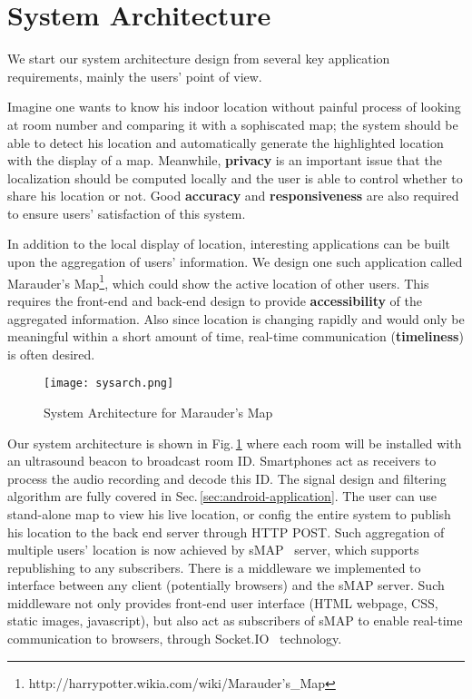 \section{System Architecture}
\label{sec:system-architecture}
We start our system architecture design from several key application requirements, mainly the users' point of view.

Imagine one wants to know his indoor location without painful process of looking at room number and comparing it with a sophiscated map; the system should be able to detect his location and automatically generate the highlighted location with the display of a map. Meanwhile, {\bf privacy} is an important issue that the localization should be computed locally and the user is able to control whether to share his location or not. Good {\bf accuracy} and {\bf responsiveness} are also required to ensure users' satisfaction of this system.  

In addition to the local display of location, interesting applications can be built upon the aggregation of users' information. We design one such application called Marauder's Map\footnote{http://harrypotter.wikia.com/wiki/Marauder's\_Map}, which could show the active location of other users. This requires the front-end and back-end design to provide {\bf accessibility} of the aggregated information. Also since location is changing rapidly and would only be meaningful within a short amount of time, real-time communication ({\bf timeliness}) is often desired.

\begin{figure}
  \centering
  \texttt{[image: sysarch.png]}
  \caption{System Architecture for Marauder's Map}
  \label{fig:sysarch}
\end{figure}

Our system architecture is shown in Fig.\,\ref{fig:sysarch} where each room will be installed with an ultrasound beacon to broadcast room ID. Smartphones act as receivers to process the audio recording and decode this ID. The signal design and filtering algorithm are fully covered in Sec.\,\ref{sec:android-application}. The user can use stand-alone map to view his live location, or config the entire system to publish his location to the back end server through HTTP POST. Such aggregation of multiple users' location is now achieved by sMAP~\cite{dawson2010smap} server, which supports republishing to any subscribers. There is a middleware we implemented to interface between any client (potentially browsers) and the sMAP server. Such middleware not only provides front-end user interface (HTML webpage, CSS, static images, javascript), but also act as subscribers of sMAP to enable real-time communication to browsers, through Socket.IO~\cite{socketio} technology.

